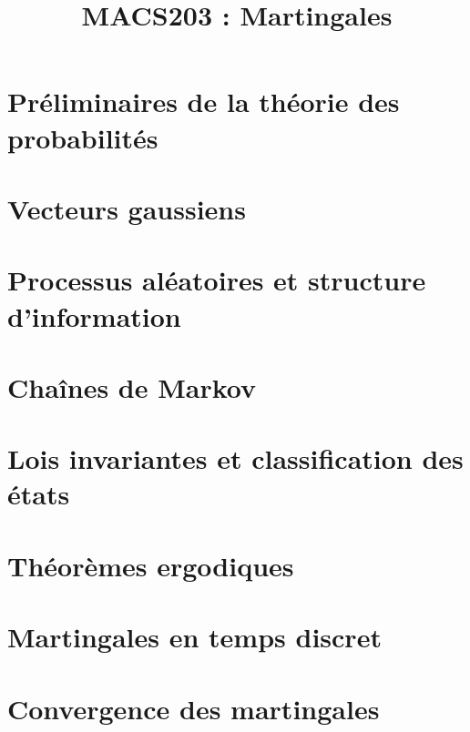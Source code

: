 \documentclass[a4paper,10pt]{article}
\title{\vspace{-1.2cm} \textbf{MACS203 : Martingales}}
\begin{document}
\maketitle

\vspace{-1.5cm}



\section{Préliminaires de la théorie des probabilités}

	



\section{Vecteurs gaussiens}

	

\section{Processus aléatoires et structure d'information}

	

\section{Chaînes de Markov}

	

\section{Lois invariantes et classification des états}

	

\section{Théorèmes ergodiques}

	

\section{Martingales en temps discret}

	

\section{Convergence des martingales}

	
\end{document}
